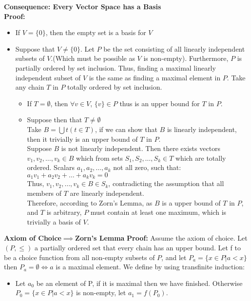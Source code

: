 \documentclass{article}
\newcommand{\0}{{\bf{0}}}
\begin{document}
\begin{enumerate}
    \textbf{Consequence: Every Vector Space has a Basis}\\
    \textbf{Proof:}
    \begin{itemize}
        \item If $V=\{0\}$, then the empty set is a basis for $V$
        \item Suppose that $V\neq\{0\}$. Let $P$ be the set consisting of all linearly independent subsets of $V$.(Which must be possible as $V$ is non-empty). Furthermore, $P$ is partially ordered by set inclusion. Thus, finding a maximal linearly independent subset of $V$ is the same as finding a maximal element in $P$.
        Take any chain $T$ in $P$ totally ordered by set inclusion.
        \begin{itemize}
            \item If $T=\emptyset$, then $\forall v\in V$, $\{v\}\in P$ thus is an upper bound for $T$ in $P$.
            \item Suppose then that $T\neq\emptyset$\\
            Take $B=\bigcup t(t\in T)$, if we can show that $B$ is linearly independent, then it trivially is an upper bound of $T$ in $P$.\\
            Suppose $B$ is not linearly independent. Then there exists vectors $v_1,v_2,\dots,v_k\in B$ which from sets $S_1,S_2,\dots,S_k\in T$ which are totally ordered. Scalars $a_1,a_2,\dots,a_k$ not all zero, such that: $a_1v_1+a_2v_2+\dots+a_kv_k=0$\\
            Thus, $v_1,v_2,\dots,v_k\in B\in S_k$, contradicting the assumption that all members of $T$ are linearly independent.\\
            Therefore, according to Zorn's Lemma, as $B$ is a upper bound of $T$ in $P$, and $T$ is arbitrary, $P$ must contain at least one maximum, which is trivially a basis of $V$.
        \end{itemize}
    \end{itemize}
    \textbf{Axiom of Choice$\implies$Zorn's Lemma}
    \textbf{Proof:} Assume the axiom of choice. Let $(P,\leq)$ a partially ordered set that every chain has an upper bound. Let f to be a choice function from all non-empty subsets of $P$, and let $P_a=\{x\in P|a<x\}$ then $P_a=\emptyset\iff a$ is a maximal element.
    We define by using transfinite induction:
    \begin{itemize}
        \item Let $a_0$ be an element of P, if it is maximal then we have finished. Otherwise $P_0=\{x\in P|a<x\}$ is non-empty, let $a_1=f(P_0)$.

\end{itemize}
\end{enumerate}
\end{document}
